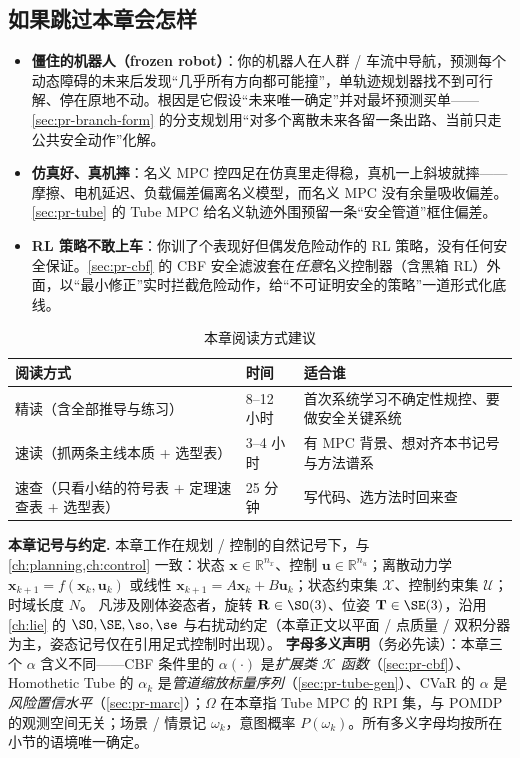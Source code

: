 \subsection*{如果跳过本章会怎样}
\begin{itemize}
  \item \textbf{僵住的机器人（frozen robot）}：你的机器人在人群 / 车流中导航，预测每个动态障碍的未来后发现“几乎所有方向都可能撞”，单轨迹规划器找不到可行解、停在原地不动。根因是它假设“未来唯一确定”并对最坏预测买单——\cref{sec:pr-branch-form} 的分支规划用“对多个离散未来各留一条出路、当前只走公共安全动作”化解。
  \item \textbf{仿真好、真机摔}：名义 MPC 控四足在仿真里走得稳，真机一上斜坡就摔——摩擦、电机延迟、负载偏差偏离名义模型，而名义 MPC 没有余量吸收偏差。\cref{sec:pr-tube} 的 Tube MPC 给名义轨迹外围预留一条“安全管道”框住偏差。
  \item \textbf{RL 策略不敢上车}：你训了个表现好但偶发危险动作的 RL 策略，没有任何安全保证。\cref{sec:pr-cbf} 的 CBF 安全滤波套在\emph{任意}名义控制器（含黑箱 RL）外面，以“最小修正”实时拦截危险动作，给“不可证明安全的策略”一道形式化底线。
\end{itemize}

\begin{table}[H]\centering\small
\caption{本章阅读方式建议}
\label{tab:pr-reading}
\begin{tabular}{lll}
\toprule
阅读方式 & 时间 & 适合谁 \\
\midrule
精读（含全部推导与练习） & 8--12 小时 & 首次系统学习不确定性规控、要做安全关键系统 \\
速读（抓两条主线本质 + 选型表） & 3--4 小时 & 有 MPC 背景、想对齐本书记号与方法谱系 \\
速查（只看小结的符号表 + 定理速查表 + 选型表） & 25 分钟 & 写代码、选方法时回来查 \\
\bottomrule
\end{tabular}
\end{table}

\begin{note}
\textbf{本章记号与约定.}\;
本章工作在规划 / 控制的自然记号下，与 \cref{ch:planning,ch:control} 一致：状态 $\mathbf{x}\in\mathbb{R}^{n_x}$、控制 $\mathbf{u}\in\mathbb{R}^{n_u}$；离散动力学 $\mathbf{x}_{k+1}=f(\mathbf{x}_k,\mathbf{u}_k)$ 或线性 $\mathbf{x}_{k+1}=A\mathbf{x}_k+B\mathbf{u}_k$；状态约束集 $\mathcal{X}$、控制约束集 $\mathcal{U}$；时域长度 $N$。
凡涉及刚体姿态者，旋转 $\mathbf{R}\in\SO(3)$、位姿 $\mathbf{T}\in\SE(3)$，沿用 \cref{ch:lie} 的 $\SO,\SE,\so,\se$ 与右扰动约定（本章正文以平面 / 点质量 / 双积分器为主，姿态记号仅在引用足式控制时出现）。
\textbf{字母多义声明}（务必先读）：本章三个 $\alpha$ 含义不同——CBF 条件里的 $\alpha(\cdot)$ 是\emph{扩展类 $\mathcal{K}$ 函数}（\cref{sec:pr-cbf}）、Homothetic Tube 的 $\alpha_k$ 是\emph{管道缩放标量序列}（\cref{sec:pr-tube-gen}）、CVaR 的 $\alpha$ 是\emph{风险置信水平}（\cref{sec:pr-marc}）；$\Omega$ 在本章指 Tube MPC 的 RPI 集，与 POMDP 的观测空间无关；场景 / 情景记 $\omega_k$，意图概率 $P(\omega_k)$。所有多义字母均按所在小节的语境唯一确定。
\end{note}

